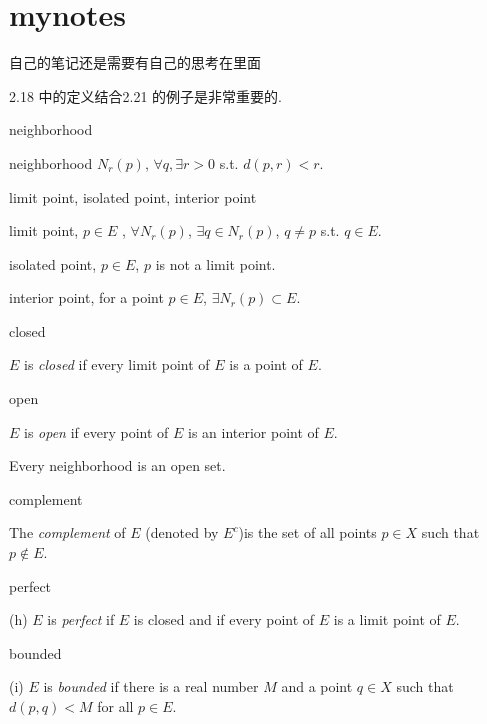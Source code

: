 \section*{mynotes}
自己的笔记还是需要有自己的思考在里面

2.18 中的定义结合2.21 的例子是非常重要的. 

\begin{mydef}neighborhood

    neighborhood $N_r(p)$, $\forall q, \exists r>0$ s.t. $d(p,r)<r$.
\end{mydef}

\begin{mydef}limit point, isolated point, interior point

    limit point, $p\in E$ , $\forall N_r(p)$, $\exists q\in N_r(p)$, $q\neq p$ s.t. $q\in E$.

    isolated point, $p\in E$, $p$ is not a limit point.

    interior point, for a point $p \in E$, $\exists N_r(p)\subset E$.
\end{mydef}

\begin{mydef} closed

    $E$ is \emph{closed} if every limit point of $E$ is a point of $E$.
\end{mydef}

\begin{mydef} open

    $E$ is \emph{open} if every point of $E$ is an interior point of $E$.
\end{mydef}

\begin{mynewthm}
    Every neighborhood is an open set.
\end{mynewthm}

\begin{mydef} complement
    
    The \emph{complement} of $E$ (denoted by $E^c$)is the set of all points $p \in X$ such that $p \not\in E$.
\end{mydef}

\begin{mydef} perfect
    
    (h) $E$ is \emph{perfect} if $E$ is closed and if every point of $E$ is a limit point of $E$.
\end{mydef}
    
\begin{mydef} bounded
    
    (i) $E$ is \emph{bounded} if there is a real number $M$ and a point $q \in X$ such that $d(p,q)< M$ for all $p \in E$.
\end{mydef}    

